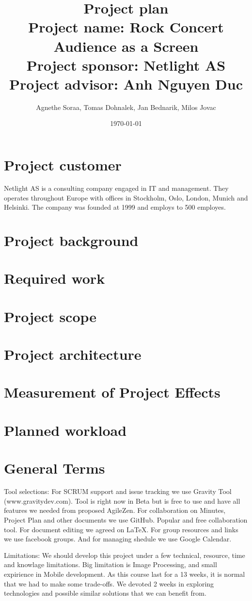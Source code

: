 \documentclass{article}
\title{\Huge Project plan \\ 
    \normalsize  Project name: Rock Concert Audience as a Screen \\
    Project sponsor: Netlight AS \\
    Project advisor: Anh Nguyen Duc}
\author{Agnethe Soraa,
Tomas Dohnalek,
Jan Bednarik,
Milos Jovac}
\date{\today}
\begin{document}
\maketitle
\section{Project customer}
Netlight AS is a consulting company engaged in IT and management. They operates throughout Europe with offices in Stockholm, Oslo, London, Munich and Helsinki. The company was founded at 1999 and employs to 500 employes.

\section{Project background}
\section{Required work}
\section{Project scope}
\section{Project architecture}
\section{Measurement of Project Effects}

\section{Planned workload}
\section{General Terms}
Tool selections:
 For SCRUM support and issue tracking we use Gravity Tool (www.gravitydev.com). Tool is right now in Beta but is free to use and have all features we needed from
 proposed AgileZen.
 For collaboration on Minutes, Project Plan and other documents we use GitHub. Popular and free collaboration tool.
 For document editing we agreed on LaTeX.
 For group resources and links we use facebook groups. And for managing shedule we use Google Calendar.
 
 Limitations:
  We should develop this project under a few technical, resource, time and knowlage limitations. Big limitation is Image Processing, and small expirience in Mobile development.
  As this course last for a 13 weeks, it is normal that we had to make some trade-offs. We devoted 2 weeks in exploring technologies and possible similar solutions that we can benefit from.
  
\end{document}
